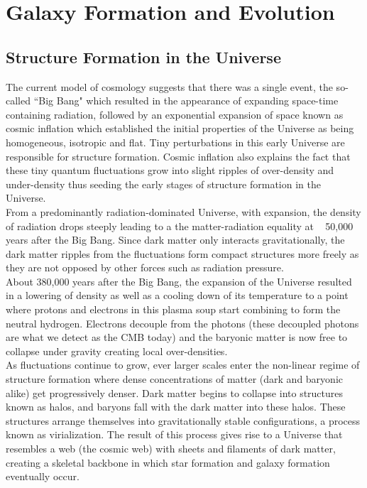 \section{Galaxy Formation and Evolution}

\subsection{Structure Formation in the Universe}
The current model of cosmology suggests that there was a single event, the so-called ``Big Bang" which resulted in the appearance of expanding space-time containing radiation, followed by an exponential expansion of space known as cosmic inflation \citep{PhysRevD.23.347} which established the initial properties of the Universe as being homogeneous, isotropic and flat. Tiny perturbations in this early Universe are responsible for structure formation. Cosmic inflation also explains the fact that these tiny quantum fluctuations grow into slight ripples of over-density and under-density thus seeding the early stages of structure formation in the Universe.\\

From a predominantly radiation-dominated Universe, with expansion, the density of radiation drops steeply leading to a the matter-radiation equality at ~ 50,000 years after the Big Bang. Since dark matter only interacts gravitationally, the dark matter ripples from the fluctuations form compact structures more freely as they are not opposed by other forces such as radiation pressure.\\

About 380,000 years after the Big Bang, the expansion of the Universe resulted in a lowering of density as well as a cooling down of its temperature to a point where protons and electrons in this plasma soup start combining to form the neutral hydrogen. Electrons decouple from the photons (these decoupled photons are what we detect as the CMB today) and the baryonic matter is now free to collapse under gravity creating local over-densities.\\

As fluctuations continue to grow, ever larger scales enter the non-linear regime of structure formation where dense concentrations of matter (dark and baryonic alike) get progressively denser. 
Dark matter begins to collapse into structures known as halos, and baryons fall with the dark matter into these halos. These structures arrange themselves into gravitationally stable configurations, a process known as virialization.
The result of this process gives rise to a Universe that resembles a web (the cosmic web) with sheets and filaments of dark matter, creating a skeletal backbone in which star formation and galaxy formation eventually occur.

